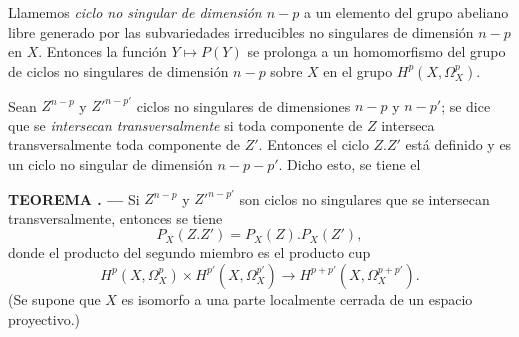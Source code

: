 \documentclass[11pt,twoside,openany]{book}
\numberwithin{equation}{section}
\newcommand{\src}[1]{%
  \phantomsection\hypertarget{src:#1}{}%
  \marginpar{\raggedleft\footnotesize\sffamily #1}%
}
\theoremstyle{plain}
\theoremstyle{definition}
\theoremstyle{remark}
\newcommand{\result}[2]{%
  \par\medskip\noindent\textbf{#1%
  \if\relax\detokenize{#2}\relax\else\space#2\fi. ---}\enspace
}
\newcommand{\FgaUnitKey}{frontmatter}
\renewcommand{\src}[1]{%
  \phantomsection\hypertarget{src:\FgaUnitKey:#1}{}%
  \marginpar{\raggedleft\footnotesize\sffamily #1}%
}
\theoremstyle{plain}
\theoremstyle{definition}
\theoremstyle{remark}
\begin{document}
Llamemos \emph{ciclo no singular de dimensión $n-p$} a un elemento del grupo
abeliano libre generado por las subvariedades irreducibles no singulares de
dimensión $n-p$ en $X$. Entonces la función $Y\longmapsto P(Y)$ se prolonga a
un homomorfismo del grupo de ciclos no singulares de dimensión $n-p$ sobre $X$
en el grupo $H^{p}(X,\Omega_X^{p})$.

Sean $Z^{n-p}$ y $Z'^{n-p'}$ ciclos no singulares de dimensiones $n-p$ y
$n-p'$; se dice que se \emph{intersecan transversalmente} si toda componente
de $Z$ interseca transversalmente toda componente de $Z'$. Entonces el ciclo $Z.Z'$ está
definido y es un ciclo no singular de dimensión $n-p-p'$. Dicho esto, se tiene el

\src{179}
\result{TEOREMA}{1} Si $Z^{n-p}$ y $Z'^{n-p'}$ son ciclos no singulares
que se intersecan transversalmente, entonces se tiene
\begin{equation}\tag{4.4}
  P_X(Z.Z')=P_X(Z).P_X(Z'),
\end{equation}
donde el producto del segundo miembro es el producto cup
\[
  H^{p}(X,\Omega_X^{p})\times H^{p'}(X,\Omega_X^{p'})
  \longrightarrow H^{p+p'}(X,\Omega_X^{p+p'}).
\]
(Se supone que $X$ es isomorfo a una parte localmente cerrada de un espacio
proyectivo.)
\end{document}
